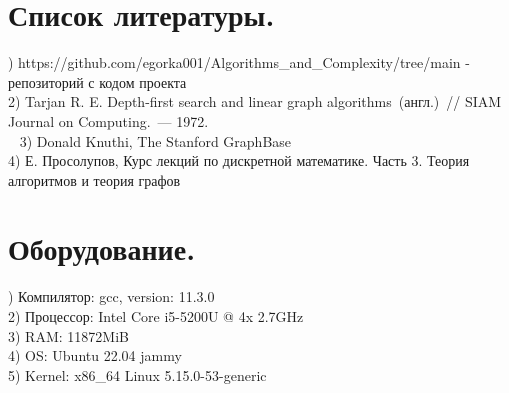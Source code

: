 \documentclass[oneside,final,14pt]{extreport}
\begin{document}
\newpage
\section{Список литературы.}
) https://github.com/egorka001/Algorithms\_and\_Complexity/tree/main - 
репозиторий с кодом проекта\\
2) Tarjan R. E. Depth-first search and linear graph algorithms (англ.) // 
SIAM Journal on Computing. — 1972.\\ 
3) Donald Knuthi, The Stanford GraphBase \\
4) Е. Просолупов, Курс лекций по дискретной математике. Часть 3. 
Теория алгоритмов и теория графов\\

\newpage
\section{Оборудование.}
) Компилятор: gcc, version: 11.3.0\\
2) Процессор: Intel Core i5-5200U @ 4x 2.7GHz\\
3) RAM: 11872MiB\\
4) OS: Ubuntu 22.04 jammy\\
5) Kernel: x86\_64 Linux 5.15.0-53-generic
\end{document}
